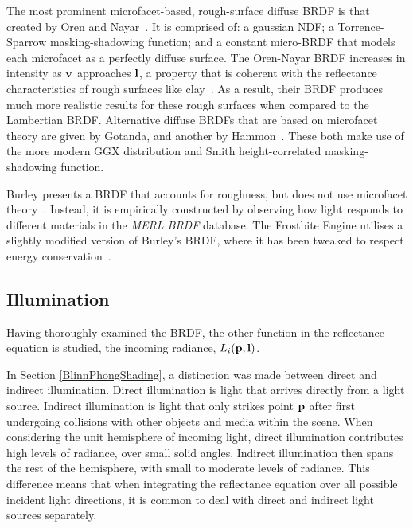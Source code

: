 The most prominent microfacet-based, rough-surface diffuse BRDF is that created by Oren and Nayar~\cite{OrenAndNayar}. It is comprised of: a gaussian NDF; a Torrence-Sparrow masking-shadowing function; and a constant micro-BRDF that models each microfacet as a perfectly diffuse surface. The Oren-Nayar BRDF increases in intensity as \begin{math}\mathbf{v}\end{math} approaches \begin{math}\mathbf{l}\end{math}, a property that is coherent with the reflectance characteristics of rough surfaces like clay~\cite{OrenAndNayar}. As a result, their BRDF produces much more realistic results for these rough surfaces when compared to the Lambertian BRDF. Alternative diffuse BRDFs that are based on microfacet theory are given by Gotanda, and another by Hammon~\cite{GotandaDiffuseBRDF, HammonBRDF}. These both make use of the more modern GGX distribution and Smith height-correlated masking-shadowing function.

Burley presents a BRDF that accounts for roughness, but does not use microfacet theory~\cite{Burley2012Physically}. Instead, it is empirically constructed by observing how light responds to different materials in the \textit{MERL BRDF} database. The Frostbite Engine utilises a slightly modified version of Burley's BRDF, where it has been tweaked to respect energy conservation~\cite{MovingFrostbitetoPBR}.

\subsection{Illumination} \label{Illumination}

Having thoroughly examined the BRDF, the other function in the reflectance equation is studied, the incoming radiance, \begin{math}L_i(\mathbf{p}, \mathbf{l})\end{math}.

In Section \ref{BlinnPhongShading}, a distinction was made between direct and indirect illumination. Direct illumination is light that arrives directly from a light source. Indirect illumination is light that only strikes point \begin{math}\mathbf{p}\end{math} after first undergoing collisions with other objects and media within the scene. When considering the unit hemisphere of incoming light, direct illumination contributes high levels of radiance, over small solid angles. Indirect illumination then spans the rest of the hemisphere, with small to moderate levels of radiance. This difference means that when integrating the reflectance equation over all possible incident light directions, it is common to deal with direct and indirect light sources separately.

